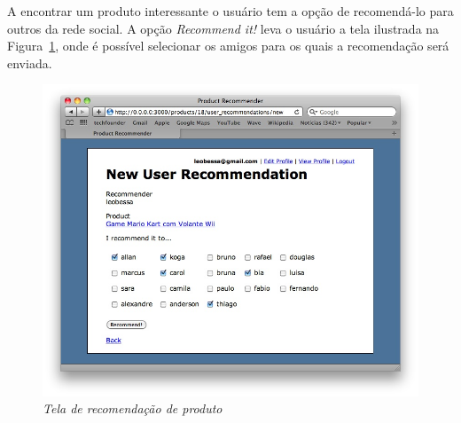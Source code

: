  A encontrar um produto interessante o usuário tem a opção de recomendá-lo para outros da rede social. A opção \emph{Recommend it!} leva o usuário a tela ilustrada na Figura~\ref{fig:recomendacao_produto_prototipo}, onde é possível selecionar os amigos para os quais a recomendação será enviada.         
 
 \begin{figure}
   \centering
   \includegraphics[width=\textwidth]{imagens/TELA_RECOMENDACAO_PROTOTIPO}
   \caption{\it Tela de recomendação de produto}
   \label{fig:recomendacao_produto_prototipo}
 \end{figure}
